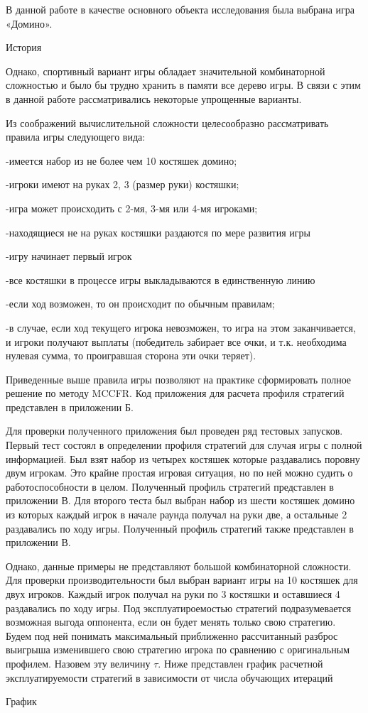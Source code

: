 В данной работе в качестве основного объекта исследования была выбрана игра «Домино».

История

Однако, спортивный вариант игры обладает значительной комбинаторной сложностью и было бы трудно хранить в памяти все дерево игры. В связи с этим в данной работе рассматривались некоторые упрощенные варианты.

Из соображений вычислительной сложности целесообразно рассматривать правила игры следующего вида:

-имеется набор из не более чем 10 костяшек домино;

-игроки имеют на руках 2, 3 (размер руки) костяшки;

-игра может происходить с 2-мя, 3-мя или 4-мя игроками;

-находящиеся не на руках костяшки раздаются по мере развития игры

-игру начинает первый игрок

-все костяшки в процессе игры выкладываются в единственную линию

-если ход возможен, то он происходит по обычным правилам;

-в случае, если ход текущего игрока невозможен, то игра на этом заканчивается, и игроки получают выплаты (победитель забирает все очки, и т.к. необходима нулевая сумма, то проигравшая сторона эти очки теряет).

Приведенные выше правила игры позволяют на практике сформировать полное решение по методу MCCFR. Код приложения для расчета профиля стратегий представлен в приложении Б.

Для проверки полученного приложения был проведен ряд тестовых запусков. Первый тест состоял в определении профиля стратегий для случая игры с полной информацией. Был взят набор из четырех костяшек которые раздавались поровну двум игрокам. Это крайне простая игровая ситуация, но по ней можно судить о работоспособности в целом. Полученный профиль стратегий представлен в приложении В. Для второго теста был выбран набор из шести костяшек домино из которых каждый игрок в начале раунда получал на руки две, а остальные 2 раздавались по ходу игры. Полученный профиль стратегий также представлен в приложении В.

Однако, данные примеры не представляют большой комбинаторной сложности. Для проверки производительности был выбран вариант игры на 10 костяшек для двух игроков. Каждый игрок получал на руки по 3 костяшки и оставшиеся 4 раздавались по ходу игры. Под эксплуатироемостью стратегий подразумевается возможная выгода оппонента, если он будет менять только свою стратегию. Будем под ней понимать максимальный приближенно рассчитанный разброс выигрыша изменившего свою стратегию игрока по сравнению с оригинальным профилем. Назовем эту величину $\tau$. Ниже представлен график расчетной эксплуатируемости стратегий в зависимости от числа обучающих итераций

График